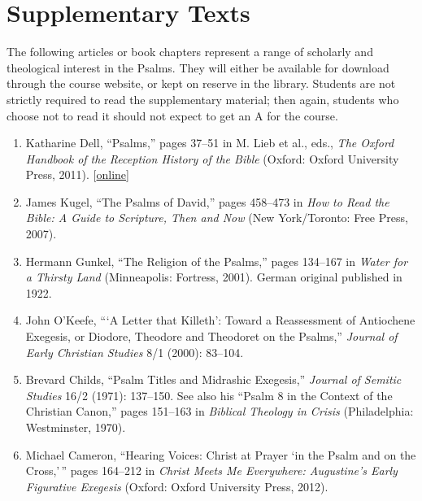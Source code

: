 \documentclass[titlepage]{article}
\begin{document}
\section{Supplementary Texts}
\label{supplementary}

The following articles or book chapters represent a range of scholarly
and theological interest in the Psalms. They will either be available
for download through the course website, or kept on reserve in the
library. Students are not strictly required to read the supplementary
material; then again, students who choose not to read it should not
expect to get an A for the course.

\begin{enumerate}

  \item Katharine Dell, “Psalms,” pages 37--51 in M. Lieb et al., eds., \emph{The Oxford Handbook of the Reception History of the Bible} (Oxford: Oxford University Press, 2011). [\href{http://ezproxy.mytyndale.ca:2048/login?url=http://www.oxfordhandbooks.com/view/10.1093/oxfordhb/9780199204540.001.0001/oxfordhb-9780199204540-e-4}{online}]

  \item James Kugel, “The Psalms of David,” pages 458–473 in \emph{How to Read the Bible: A Guide to Scripture, Then and Now} (New York/Toronto: Free Press, 2007).

  \item Hermann Gunkel, “The Religion of the Psalms,” pages 134–167 in \emph{Water for a Thirsty Land} (Minneapolis: Fortress, 2001). German original published in 1922.

  \item John O’Keefe, “‘A Letter that Killeth’: Toward a Reassessment of Antiochene Exegesis, or Diodore, Theodore and Theodoret on the Psalms,” \emph{Journal of Early Christian Studies} 8/1 (2000): 83–104.

  \item Brevard Childs, “Psalm Titles and Midrashic Exegesis,” \emph{Journal of Semitic Studies} 16/2 (1971): 137--150. See also his “Psalm 8 in the Context of the Christian Canon,” pages 151–163 in \emph{Biblical Theology in Crisis} (Philadelphia: Westminster, 1970).

  \item Michael Cameron, ``Hearing Voices: Christ at Prayer `in the Psalm and on the Cross,'\,'' pages 164--212 in \emph{Christ Meets Me Everywhere: Augustine's Early Figurative Exegesis} (Oxford: Oxford University Press, 2012).


\end{enumerate}
\end{document}
